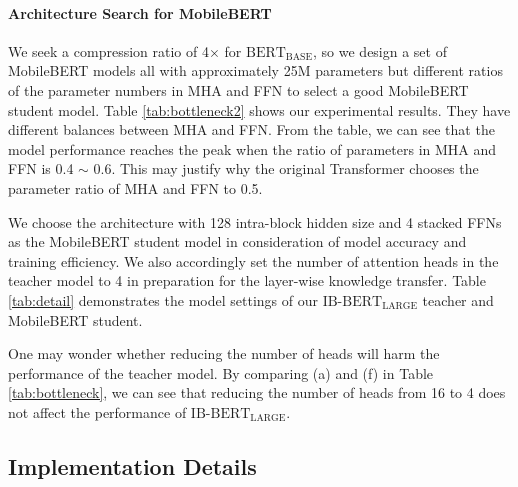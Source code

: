 \documentclass[11pt,a4paper]{article}
\begin{document}
\begin{table*}[t]
\begin{center}
{\begin{tabular}{l | c c c| c c c c c c c c | c}
			\hline
		\end{tabular}
	}
	\end{center}
	\caption{The test results on the GLUE benchmark (except WNLI). The number below each task denotes the number of training examples. The metrics for these tasks can be found in the GLUE paper \citep{wang2018glue}. ``OPT'' denotes the operational optimizations introduced in Section \ref{sec:opt}. \dag denotes that the results are taken from \cite{jiao2019tinybert}. *denotes that it can be unfair to directly compare MobileBERT with these models since MobileBERT is task-agnosticly compressed while these models use the teacher model in the fine-tuning stage.}
	\label{tab:glue}
\end{table*}
\setlength{\tabcolsep}{6pt}

\paragraph{Architecture Search for MobileBERT}

We seek a compression ratio of 4$\times$ for $\text{BERT}_\text{BASE}$, so we design a set of MobileBERT models all with approximately 25M parameters but different ratios of the parameter numbers in MHA and FFN to select a good MobileBERT student model. Table \ref{tab:bottleneck2} shows our experimental results.
They have different balances between MHA and FFN. 
From the table, we can see that the model performance reaches the peak when the ratio of parameters in MHA and FFN is 0.4 $\sim$ 0.6. This may justify why the original Transformer chooses the parameter ratio of MHA and FFN to 0.5. 

We choose the architecture with 128 intra-block hidden size and 4 stacked FFNs as the MobileBERT student model in consideration of model accuracy and training efficiency. We also accordingly set the number of attention heads in the teacher model to 4 in preparation for the layer-wise knowledge transfer. Table \ref{tab:detail} demonstrates the model settings of our $\text{IB-BERT}_\text{LARGE}$ teacher and MobileBERT student.

One may wonder whether reducing the number of heads will harm the performance of the teacher model. By comparing (a) and (f) in Table \ref{tab:bottleneck}, we can see that reducing the number of heads from 16 to 4 does not affect the performance of $\text{IB-BERT}_\text{LARGE}$.


\subsection{Implementation Details}
\end{document}

